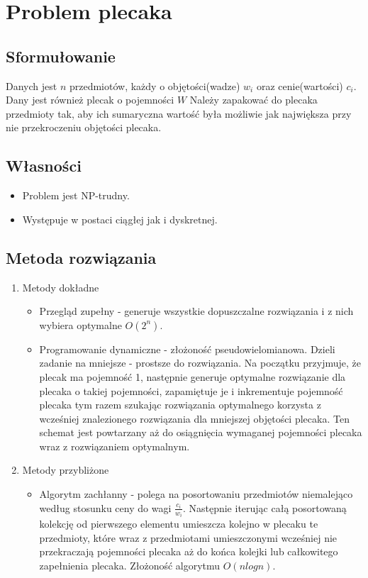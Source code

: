 \section{Problem plecaka}

	\subsection{Sformułowanie}
		Danych jest $n$ przedmiotów, każdy o objętości(wadze) $w_i$ oraz cenie(wartości) $c_i$.
		Dany jest również plecak o pojemności $W$
		Należy zapakować do plecaka przedmioty tak, aby ich sumaryczna wartość była możliwie jak największa przy
		nie przekroczeniu objętości plecaka.
		
	\subsection{Własności}
		\begin{itemize}
			\item Problem jest NP-trudny.
			\item Występuje w postaci ciągłej jak i dyskretnej.
		\end{itemize}
	\subsection{Metoda rozwiązania} \label{knapsack}
		\begin{enumerate}
			\item Metody dokładne
			\begin{itemize}
				\item Przegląd zupełny - generuje wszystkie dopuszczalne rozwiązania i z nich wybiera optymalne $O(2^n)$.
				\item Programowanie dynamiczne - złożoność pseudowielomianowa. Dzieli zadanie na mniejsze - prostsze do 
				rozwiązania. Na początku przyjmuje, że plecak ma pojemność 1, następnie generuje optymalne rozwiązanie
				dla plecaka o takiej pojemności, zapamiętuje je i inkrementuje pojemność plecaka tym razem szukając 
				rozwiązania optymalnego korzysta z wcześniej znalezionego rozwiązania dla mniejszej objętości plecaka.
				Ten schemat jest powtarzany aż do osiągnięcia wymaganej pojemności plecaka wraz z rozwiązaniem optymalnym.
			\end{itemize}
			\item Metody przybliżone
			\begin{itemize}
				\item Algorytm zachłanny - polega na posortowaniu przedmiotów niemalejąco według stosunku ceny do wagi 
				$\frac{c_i}{w_i}$. Następnie iterując całą posortowaną kolekcję od pierwszego elementu
				 umieszcza kolejno w plecaku te przedmioty, które wraz z przedmiotami umieszczonymi wcześniej nie 
				 przekraczają pojemności plecaka aż do końca kolejki lub całkowitego zapełnienia plecaka. 
				 Złożoność algorytmu $O(n logn)$.
			\end{itemize}
		\end{enumerate}
